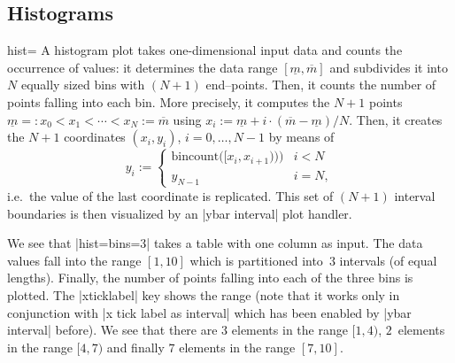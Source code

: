 \subsection{Histograms}
\label{sec:histograms}
\begin{plottype}[/pgfplots]{hist=\textcolor{black}{\normalfont{}}}
	A histogram plot takes one-dimensional input data and counts the occurrence of values: it determines the data range $[\underline m,\overline m]$ and subdivides it into $N$ equally sized bins with $(N+1)$ end--points. Then, it counts the number of points falling into each bin. More precisely, it computes the $N+1$ points $\underline m =: x_0 < x_1 < \dotsb < x_N := \overline m$ using $x_i := \underline m + i \cdot (\overline m - \underline m)/N$. Then, it creates the $N+1$ coordinates $(x_i, y_i)$, $i=0,\dotsc,N-1$ by means of
	\[
  y_i := 
  \begin{cases}
  \text{bincount}\bigl([x_i,x_{i+1})\bigr)\Bigr) & i<N\\
  y_{N-1} & i = N,
\end{cases}
	\]
	i.e.\ the value of the last coordinate is replicated.
	This set of $(N+1)$ interval boundaries is then visualized by an |ybar interval| plot handler.
\begin{codeexample}[]
\end{codeexample}
	We see that |hist={bins=3}| takes a table with one column as input. The data values fall into the range $[1,10]$ which is partitioned into~$3$ intervals (of equal lengths). Finally, the number of points falling into each of the three bins is plotted. The |xticklabel| key shows the range (note that it works only in conjunction with |x tick label as interval| which has been enabled by |ybar interval| before). We see that there are $3$ elements in the range $[1,4)$, $2$~elements in the range $[4,7)$ and finally $7$ elements in the range $[7,10]$. 
	

\end{plottype}
